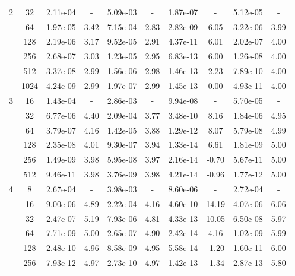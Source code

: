 \begin{table}[htbp]
\begin{center}
\begin{tabular}{| c | c | c c | c c | c c | c c |}
			\hline

			2	& 32 & 2.11e-04 & - & 5.09e-03 & - & 1.87e-07 & - & 5.12e-05 & - \\
				& 64 & 1.97e-05 & 3.42 & 7.15e-04 & 2.83 & 2.82e-09 & 6.05 & 3.22e-06 & 3.99 \\
				& 128 & 2.19e-06 & 3.17 & 9.52e-05 & 2.91 & 4.37e-11 & 6.01 & 2.02e-07 & 4.00 \\
				& 256 & 2.68e-07 & 3.03 & 1.23e-05 & 2.95 & 6.83e-13 & 6.00 & 1.26e-08 & 4.00 \\
				& 512 & 3.37e-08 & 2.99 & 1.56e-06 & 2.98 & 1.46e-13 & 2.23 & 7.89e-10 & 4.00 \\
				& 1024 & 4.24e-09 & 2.99 & 1.97e-07 & 2.99 & 1.45e-13 & 0.00 & 4.93e-11 & 4.00 \\

			\hline

			3	& 16 & 1.43e-04 & - & 2.86e-03 & - & 9.94e-08 & - & 5.70e-05 & - \\
				& 32 & 6.77e-06 & 4.40 & 2.09e-04 & 3.77 & 3.48e-10 & 8.16 & 1.84e-06 & 4.95 \\
				& 64 & 3.79e-07 & 4.16 & 1.42e-05 & 3.88 & 1.29e-12 & 8.07 & 5.79e-08 & 4.99 \\
				& 128 & 2.35e-08 & 4.01 & 9.30e-07 & 3.94 & 1.33e-14 & 6.61 & 1.81e-09 & 5.00 \\
				& 256 & 1.49e-09 & 3.98 & 5.95e-08 & 3.97 & 2.16e-14 & -0.70 & 5.67e-11 & 5.00 \\
				& 512 & 9.46e-11 & 3.98 & 3.76e-09 & 3.98 & 4.21e-14 & -0.96 & 1.77e-12 & 5.00 \\

			\hline

			4	& 8 & 2.67e-04 & - & 3.98e-03 & - & 8.60e-06 & - & 2.72e-04 & - \\
				& 16 & 9.00e-06 & 4.89 & 2.22e-04 & 4.16 & 4.60e-10 & 14.19 & 4.07e-06 & 6.06 \\
				& 32 & 2.47e-07 & 5.19 & 7.93e-06 & 4.81 & 4.33e-13 & 10.05 & 6.50e-08 & 5.97 \\
				& 64 & 7.71e-09 & 5.00 & 2.65e-07 & 4.90 & 2.42e-14 & 4.16 & 1.02e-09 & 5.99 \\
				& 128 & 2.48e-10 & 4.96 & 8.58e-09 & 4.95 & 5.58e-14 & -1.20 & 1.60e-11 & 6.00 \\
				& 256 & 7.93e-12 & 4.97 & 2.73e-10 & 4.97 & 1.42e-13 & -1.34 & 2.87e-13 & 5.80 \\

			\hline
		\end{tabular}
	\end{center}
\end{table}


